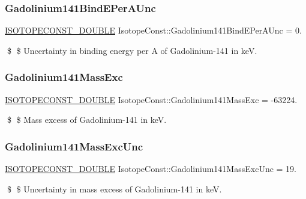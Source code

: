 \subsubsection{\texorpdfstring{Gadolinium141\+Bind\+E\+Per\+A\+Unc}{Gadolinium141BindEPerAUnc}}
{\footnotesize\ttfamily \mbox{\hyperlink{group___isotope_const-_macros_ga8f45a7272ce02c0b4c65c44636ed719a}{I\+S\+O\+T\+O\+P\+E\+C\+O\+N\+S\+T\+\_\+\+D\+O\+U\+B\+LE}} Isotope\+Const\+::\+Gadolinium141\+Bind\+E\+Per\+A\+Unc = 0.}

\$ \$ Uncertainty in binding energy per A of Gadolinium-\/141 in keV. \mbox{\label{group___isotope_const-_gadolinium-_gd141_ga98f54b2095c3e3fdca46147b08db3417}} 
\subsubsection{\texorpdfstring{Gadolinium141\+Mass\+Exc}{Gadolinium141MassExc}}
{\footnotesize\ttfamily \mbox{\hyperlink{group___isotope_const-_macros_ga8f45a7272ce02c0b4c65c44636ed719a}{I\+S\+O\+T\+O\+P\+E\+C\+O\+N\+S\+T\+\_\+\+D\+O\+U\+B\+LE}} Isotope\+Const\+::\+Gadolinium141\+Mass\+Exc = -\/63224.}

\$ \$ Mass excess of Gadolinium-\/141 in keV. \mbox{\label{group___isotope_const-_gadolinium-_gd141_ga5f7a96938bace0be00e2c66b40bfbc89}} 
\subsubsection{\texorpdfstring{Gadolinium141\+Mass\+Exc\+Unc}{Gadolinium141MassExcUnc}}
{\footnotesize\ttfamily \mbox{\hyperlink{group___isotope_const-_macros_ga8f45a7272ce02c0b4c65c44636ed719a}{I\+S\+O\+T\+O\+P\+E\+C\+O\+N\+S\+T\+\_\+\+D\+O\+U\+B\+LE}} Isotope\+Const\+::\+Gadolinium141\+Mass\+Exc\+Unc = 19.}

\$ \$ Uncertainty in mass excess of Gadolinium-\/141 in keV. \mbox{\label{group___isotope_const-_gadolinium-_gd141_ga65fb25d9d807d50a2f3fcb0e9636d10b}} 
